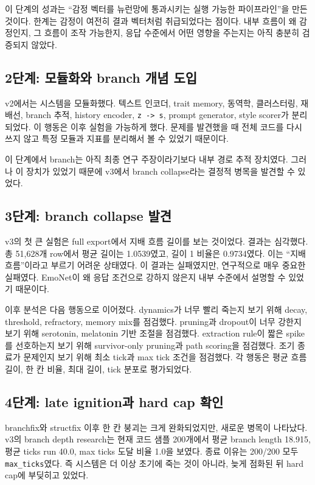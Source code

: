 \documentclass[11pt,a4paper]{article}
\newcommand{\eng}[1]{\texttt{#1}}
\begin{document}
이 단계의 성과는 ``감정 벡터를 뉴런망에 통과시키는 실행 가능한 파이프라인''을 만든 것이다. 한계는 감정이 여전히 결과 벡터처럼 취급되었다는 점이다. 내부 흐름이 왜 감정인지, 그 흐름이 조작 가능한지, 응답 수준에서 어떤 영향을 주는지는 아직 충분히 검증되지 않았다.

\subsection{2단계: 모듈화와 branch 개념 도입}

v2에서는 시스템을 모듈화했다. 텍스트 인코더, trait memory, 동역학, 클러스터링, 재배선, branch 추적, history encoder, \eng{z -> s}, prompt generator, style scorer가 분리되었다. 이 행동은 이후 실험을 가능하게 했다. 문제를 발견했을 때 전체 코드를 다시 쓰지 않고 특정 모듈과 지표를 분리해서 볼 수 있었기 때문이다.

이 단계에서 branch는 아직 최종 연구 주장이라기보다 내부 경로 추적 장치였다. 그러나 이 장치가 있었기 때문에 v3에서 branch collapse라는 결정적 병목을 발견할 수 있었다.

\subsection{3단계: branch collapse 발견}

v3의 첫 큰 실험은 full export에서 지배 흐름 길이를 보는 것이었다. 결과는 심각했다. 총 51,628개 row에서 평균 길이는 1.0539였고, 길이 1 비율은 0.9734였다. 이는 ``지배 흐름''이라고 부르기 어려운 상태였다. 이 결과는 실패였지만, 연구적으로 매우 중요한 실패였다. EmoNet이 왜 응답 조건으로 강하지 않은지 내부 수준에서 설명할 수 있었기 때문이다.

이후 분석은 다음 행동으로 이어졌다. dynamics가 너무 빨리 죽는지 보기 위해 decay, threshold, refractory, memory mix를 점검했다. pruning과 dropout이 너무 강한지 보기 위해 serotonin, melatonin 기반 조절을 점검했다. extraction rule이 짧은 spike를 선호하는지 보기 위해 survivor-only pruning과 path scoring을 점검했다. 조기 종료가 문제인지 보기 위해 최소 tick과 max tick 조건을 점검했다. 각 행동은 평균 흐름 길이, 한 칸 비율, 최대 길이, tick 분포로 평가되었다.

\subsection{4단계: late ignition과 hard cap 확인}

branchfix와 structfix 이후 한 칸 붕괴는 크게 완화되었지만, 새로운 병목이 나타났다. v3의 branch depth research는 현재 코드 샘플 200개에서 평균 branch length 18.915, 평균 ticks run 40.0, max ticks 도달 비율 1.0을 보였다. 종료 이유는 200/200 모두 \eng{max\_ticks}였다. 즉 시스템은 더 이상 초기에 죽는 것이 아니라, 늦게 점화된 뒤 hard cap에 부딪히고 있었다.
\end{document}
